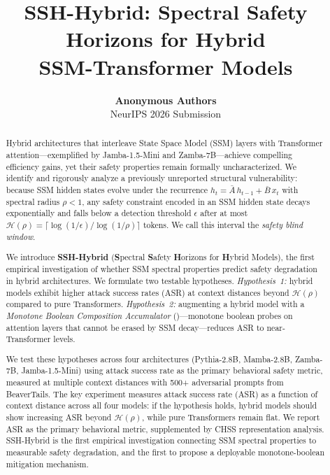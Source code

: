 \documentclass{article}
\title{SSH-Hybrid: Spectral Safety Horizons for Hybrid\\
SSM-Transformer Models}
\author{%
  \textbf{Anonymous Authors}\\
  NeurIPS 2026 Submission
}
\newcommand{\Horizon}{\mathcal{H}(\rho)}
\newcommand{\MBCA}{\mathrm{MBCA}}
\begin{document}
\maketitle

\begin{abstract}
Hybrid architectures that interleave State Space Model (SSM) layers with
Transformer attention---exemplified by Jamba-1.5-Mini and Zamba-7B---achieve
compelling efficiency gains, yet their safety properties remain formally
uncharacterized.  We identify and rigorously analyze a previously unreported
structural vulnerability: because SSM hidden states evolve under the recurrence
$h_t = \bar{A}\, h_{t-1} + \bar{B}\, x_t$ with spectral radius $\rho < 1$,
any safety constraint encoded in an SSM hidden state decays exponentially and
falls below a detection threshold $\epsilon$ after at most
$\Horizon = \lceil \log(1/\epsilon) / \log(1/\rho) \rceil$ tokens.  We call
this interval the \emph{safety blind window}.

We introduce \textbf{SSH-Hybrid} (\textbf{S}pectral \textbf{S}afety
\textbf{H}orizons for \textbf{H}ybrid Models), the first empirical
investigation of whether SSM spectral properties predict safety degradation
in hybrid architectures.  We formulate two testable hypotheses.
\emph{Hypothesis~1:} hybrid models exhibit higher attack success rates (ASR)
at context distances beyond $\Horizon$ compared to pure Transformers.
\emph{Hypothesis~2:} augmenting a hybrid model with a
\emph{Monotone Boolean Composition Accumulator} (\MBCA{})---monotone
boolean probes on attention layers that cannot be erased by SSM
decay---reduces ASR to near-Transformer levels.

We test these hypotheses across four architectures (Pythia-2.8B, Mamba-2.8B,
Zamba-7B, Jamba-1.5-Mini) using attack success rate as the primary behavioral
safety metric, measured at multiple context distances with 500+ adversarial
prompts from BeaverTails.
The key experiment measures attack success rate (ASR) as a function of
context distance across all four models: if the hypothesis holds, hybrid
models should show increasing ASR beyond $\Horizon$, while pure Transformers
remain flat.  We report ASR as the primary behavioral metric, supplemented
by CHSS representation analysis.  SSH-Hybrid is the first empirical
investigation connecting SSM spectral properties to measurable safety
degradation, and the first to propose a deployable monotone-boolean
mitigation mechanism.
\end{abstract}
\end{document}
